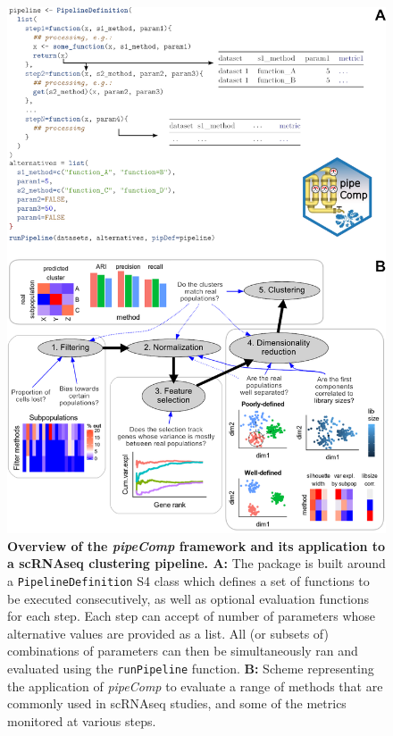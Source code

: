\documentclass{bmcart}
\begin{document}
\begin{figure}
    \centering
    \includegraphics[width=\textwidth,keepaspectratio]{main_figures/pipeline_explanation.png}
    \caption{\textbf{Overview of the \textit{pipeComp} framework and its application to a scRNAseq clustering pipeline. A:} The package is built around a \texttt{PipelineDefinition} S4 class which defines a set of functions to be executed consecutively, as well as optional evaluation functions for each step. Each step can accept of number of parameters whose alternative values are provided as a list. All (or subsets of) combinations of parameters can then be simultaneously ran and evaluated using the \texttt{runPipeline} function. \textbf{B:} Scheme representing the application of \textit{pipeComp} to evaluate a range of methods that are commonly used in scRNAseq studies, and some of the metrics monitored at various steps.}
    \label{fig:figure2}
\end{figure}
\end{document}
